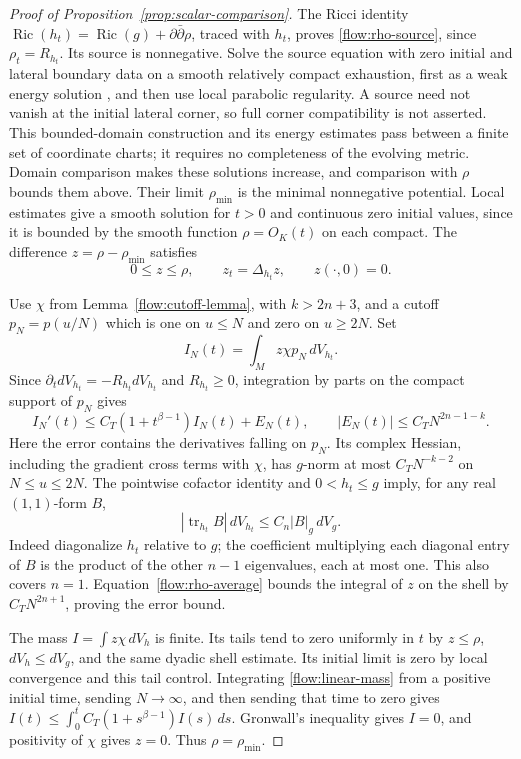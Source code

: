 \documentclass[11pt]{article}
\theoremstyle{definition}
\theoremstyle{remark}
\newcommand{\dd}{\partial\bar\partial}
\DeclareMathOperator{\Ric}{Ric}
\DeclareMathOperator{\tr}{tr}
\numberwithin{equation}{section}
\begin{document}
\begin{proof}[Proof of Proposition~\ref{prop:scalar-comparison}]
The Ricci identity
$\Ric(h_t)=\Ric(g)+\dd\rho$, traced with $h_t$, proves
\eqref{flow:rho-source}, since $\rho_t=R_{h_t}$.
Its source is nonnegative.
Solve the source equation with zero initial and lateral boundary
data on a smooth relatively compact exhaustion, first as a weak
energy solution \cite[Chapter~III, Theorem~4.1]{LSU}, and then use
local parabolic regularity.  A source need not vanish at the
initial lateral corner, so full corner compatibility is not
asserted.  This bounded-domain construction and its energy
estimates pass between a finite set of coordinate charts; it
requires no completeness of the evolving metric.
Domain comparison makes these solutions increase, and
comparison with $\rho$ bounds them above.  Their limit $\rho_{\min}$
is the minimal nonnegative potential.  Local estimates give a smooth
solution for $t>0$ and continuous zero initial values, since it is
bounded by the smooth function $\rho=O_K(t)$ on each compact.
The difference $z=\rho-\rho_{\min}$ satisfies
\[
 0\le z\le\rho,\qquad z_t=\Delta_{h_t}z,
 \qquad z(\cdot,0)=0.
\]

Use $\chi$ from Lemma~\ref{flow:cutoff-lemma}, with $k>2n+3$,
and a cutoff $p_N=p(u/N)$ which is one on $u\le N$ and zero on
$u\ge2N$.  Set
\[
 I_N(t)=\int_M z\chi p_N\,dV_{h_t}.
\]
Since $\partial_tdV_{h_t}=-R_{h_t}dV_{h_t}$ and $R_{h_t}\ge0$,
integration by parts on the compact support of $p_N$ gives
\begin{equation}\label{flow:linear-mass}
 I_N'(t)\le C_T(1+t^{\beta-1})I_N(t)+E_N(t),
 \qquad |E_N(t)|\le C_TN^{2n-1-k}.
\end{equation}
Here the error contains the derivatives falling on $p_N$.  Its
complex Hessian, including the gradient cross terms with $\chi$,
has $g$-norm at most $C_TN^{-k-2}$ on $N\le u\le2N$.
The pointwise cofactor identity and $0<h_t\le g$ imply, for any
real $(1,1)$-form $B$,
\begin{equation}\label{flow:cofactor}
 |\tr_{h_t}B|\,dV_{h_t}
 \le C_n|B|_g\,dV_g.
\end{equation}
Indeed diagonalize $h_t$ relative to $g$; the coefficient multiplying
each diagonal entry of $B$ is the product of the other $n-1$
eigenvalues, each at most one.  This also covers $n=1$.
Equation~\eqref{flow:rho-average} bounds the integral of $z$ on the
shell by $C_TN^{2n+1}$, proving the error bound.

The mass $I=\int z\chi\,dV_h$ is finite.  Its tails tend to zero
uniformly in $t$ by $z\le\rho$, $dV_h\le dV_g$, and the same
dyadic shell estimate.  Its initial limit is zero by local
convergence and this tail control.  Integrating
\eqref{flow:linear-mass} from a positive initial time, sending
$N\to\infty$, and then sending that time to zero gives
$I(t)\le\int_0^tC_T(1+s^{\beta-1})I(s)\,ds$.
Gronwall's inequality gives $I=0$, and positivity of $\chi$ gives
$z=0$.  Thus $\rho=\rho_{\min}$.


\end{proof}
\end{document}
